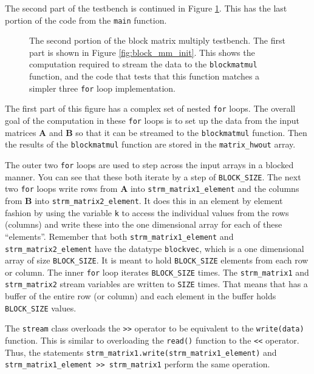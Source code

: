 The second part of the testbench is continued in Figure \ref{fig:block_mm_final}. This has the last portion of the code from the \lstinline{main} function. 

\begin{figure}

\caption{  The second portion of the block matrix multiply testbench. The first part is shown in Figure \ref{fig:block_mm_init}. This shows the computation required to stream the data to the \lstinline{blockmatmul} function, and the code that tests that this function matches a simpler three \lstinline{for} loop implementation. }
\label{fig:block_mm_final}
\end{figure}

The first part of this figure has a complex set of nested \lstinline{for} loops. The overall goal of the computation in these \lstinline{for} loops is to set up the data from the input matrices $\mathbf{A}$ and $\mathbf{B}$ so that it can be streamed to the \lstinline{blockmatmul} function. Then the results of the \lstinline{blockmatmul} function are stored in the \lstinline{matrix_hwout} array. 

The outer two \lstinline{for} loops are used to step across the input arrays in a blocked manner. You can see that these both iterate by a step of \lstinline{BLOCK_SIZE}. The next two \lstinline{for} loops write rows from $\mathbf{A}$ into \lstinline{strm_matrix1_element} and the columns from $\mathbf{B}$ into \lstinline{strm_matrix2_element}. It does this in an element by element fashion by using the variable \lstinline{k} to access the individual values from the rows (columns) and write these into the one dimensional array for each of these ``elements''. Remember that both \lstinline{strm_matrix1_element} and \lstinline{strm_matrix2_element} have the datatype \lstinline{blockvec}, which is a one dimensional array of size \lstinline{BLOCK_SIZE}. It is meant to hold \lstinline{BLOCK_SIZE} elements from each row or column. The inner \lstinline{for} loop iterates \lstinline{BLOCK_SIZE} times. The \lstinline{strm_matrix1} and \lstinline{strm_matrix2} stream variables are written to \lstinline{SIZE} times. That means that has a buffer of the entire row (or column) and each element in the buffer holds \lstinline{BLOCK_SIZE} values. 

\begin{aside}
The \lstinline{stream} class overloads the \lstinline{>>} operator to be equivalent to the \lstinline{write(data)} function. This is similar to overloading the \lstinline{read()} function to the \lstinline{<<} operator. Thus, the statements \lstinline{strm_matrix1.write(strm_matrix1_element)} and \lstinline{strm_matrix1_element >> strm_matrix1} perform the same operation.
\end{aside}

